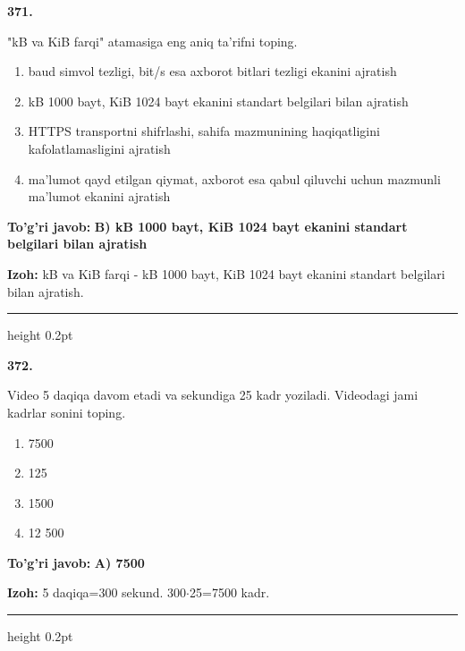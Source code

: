 \documentclass[10pt,a4paper,oneside]{article}
\begin{document}
\noindent\textbf{\color{ink}371.}
\par
"kB va KiB farqi" atamasiga eng aniq ta'rifni toping.
\begin{enumerate}[label=\Alph*),leftmargin=9mm]
\item baud simvol tezligi, bit/s esa axborot bitlari tezligi ekanini ajratish
\item kB 1000 bayt, KiB 1024 bayt ekanini standart belgilari bilan ajratish
\item HTTPS transportni shifrlashi, sahifa mazmunining haqiqatligini kafolatlamasligini ajratish
\item ma'lumot qayd etilgan qiymat, axborot esa qabul qiluvchi uchun mazmunli ma'lumot ekanini ajratish
\end{enumerate}
\begin{tcolorbox}[enhanced,breakable,colback=teal!4,colframe=teal!50!black,boxrule=0.5pt,arc=1.1mm,left=3mm,right=3mm,top=1.7mm,bottom=1.7mm,before skip=2mm,after skip=2mm]
\textbf{\color{teal}To'g'ri javob:} \textbf{B) kB 1000 bayt, KiB 1024 bayt ekanini standart belgilari bilan ajratish}
\par\smallskip
\textbf{Izoh:} kB va KiB farqi - kB 1000 bayt, KiB 1024 bayt ekanini standart belgilari bilan ajratish.
\end{tcolorbox}
\vspace{2mm}\hrule height 0.2pt \vspace{3mm}

\noindent\textbf{\color{ink}372.}
\par
Video 5 daqiqa davom etadi va sekundiga 25 kadr yoziladi. Videodagi jami kadrlar sonini toping.
\begin{enumerate}[label=\Alph*),leftmargin=9mm]
\item 7500
\item 125
\item 1500
\item 12 500
\end{enumerate}
\begin{tcolorbox}[enhanced,breakable,colback=teal!4,colframe=teal!50!black,boxrule=0.5pt,arc=1.1mm,left=3mm,right=3mm,top=1.7mm,bottom=1.7mm,before skip=2mm,after skip=2mm]
\textbf{\color{teal}To'g'ri javob:} \textbf{A) 7500}
\par\smallskip
\textbf{Izoh:} 5 daqiqa=300 sekund. 300\ensuremath{\cdot}25=7500 kadr.
\end{tcolorbox}
\vspace{2mm}\hrule height 0.2pt \vspace{3mm}
\end{document}
